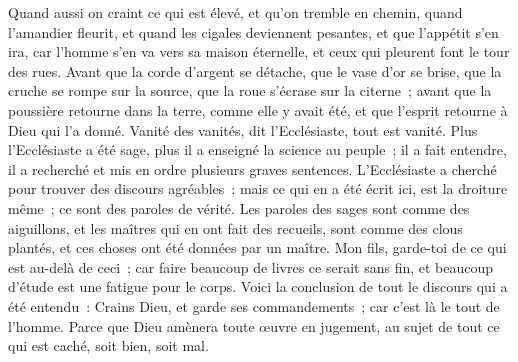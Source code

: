 \begin{multicols}{2}
Quand aussi on craint ce qui est élevé, et qu'on tremble en chemin, quand l'amandier fleurit, et quand les cigales deviennent pesantes, et que l'appétit s'en ira, car l'homme s'en va vers sa maison éternelle, et ceux qui pleurent font le tour des rues.
Avant que la corde d'argent se détache, que le vase d'or se brise, que la cruche se rompe sur la source, que la roue s'écrase sur la citerne~;
avant que la poussière retourne dans la terre, comme elle y avait été, et que l'esprit retourne à Dieu qui l'a donné.
Vanité des vanités, dit l'Ecclésiaste, tout est vanité.
Plus l'Ecclésiaste a été sage, plus il a enseigné la science au peuple~; il a fait entendre, il a recherché et mis en ordre plusieurs graves sentences.
L'Ecclésiaste a cherché pour trouver des discours agréables~; mais ce qui en a été écrit ici, est la droiture même~; ce sont des paroles de vérité.
Les paroles des sages sont comme des aiguillons, et les maîtres qui en ont fait des recueils, sont comme des clous plantés, et ces choses ont été données par un maître.
Mon fils, garde-toi de ce qui est au-delà de ceci~; car faire beaucoup de livres ce serait sans fin, et beaucoup d’étude est une fatigue pour le corps.
Voici la conclusion de tout le discours qui a été entendu~: Crains Dieu, et garde ses commandements~; car c'est là le tout de l'homme.
Parce que Dieu amènera toute œuvre en jugement, au sujet de tout ce qui est caché, soit bien, soit mal.
\PPE{}
\end{multicols}

